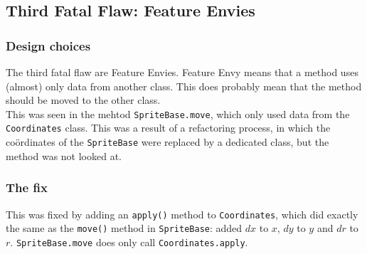 \subsection{Third Fatal Flaw: Feature Envies}

\subsubsection{Design choices}
The third fatal flaw are Feature Envies. Feature Envy means that a method uses (almost) only data from another class. This does probably mean that the method should be moved to the other class. \\
This was seen in the mehtod \texttt{SpriteBase.move}, which only used data from the \texttt{Coordinates} class. This was a result of a refactoring process, in which the co\"{o}rdinates of the \texttt{SpriteBase} were replaced by a dedicated class, but the method was not looked at.

\subsubsection{The fix}
This was fixed by adding an \texttt{apply()} method to \texttt{Coordinates}, which did exactly the same as the \texttt{move()} method in \texttt{SpriteBase}: added $dx$ to $x$, $dy$ to $y$ and $dr$ to $r$. \texttt{SpriteBase.move} does only call \texttt{Coordinates.apply}.